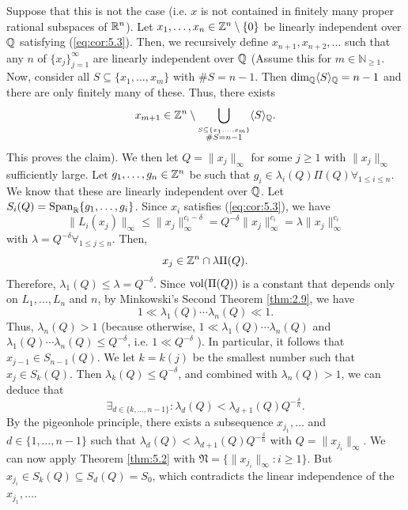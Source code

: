 \documentclass{Vorlesungstemplate_English} %
\renewcommand{\N}{\mathbb{N}_{\geq 1}}
\begin{document}
\begin{pf}
  Suppose that this is not the case (i.e. $x$ is not contained in finitely many proper rational subspaces of $\mathbb{R}^n$). Let $x_1, \dots, x_n \in \mathbb{Z}^n \setminus \{ 0\}$ be linearly independent over $\mathbb{Q}$ satisfying (\ref{eq:cor:5.3}). Then, we recursively define $x_{n+1}, x_{n+2}, \dots$ such that any $n$ of $\{ x_j\}_{j=1}^{\infty}$ are linearly independent over $\mathbb{Q}$ {\color{blue} (Assume this for $m \in \N$. Now, consider all $S \subseteq \{ x_1, \dots , x_m\}$ with $\# S = n-1$. Then $\dim_{\mathbb{Q}}\langle S\rangle_{\mathbb{Q}} = n-1$ and there are only finitely many of these. Thus, there exists \[x_{m+1} \in \mathbb{Z}^n \setminus \bigcup_{\stackrel{S \subseteq \{ x_1, \dots, x_m\}}{\#S = n-1}} \langle S \rangle_{\mathbb{Q}}.\]
  This proves the claim)}. We then let $Q = \|x_j\|_{\infty}$ for some $j \geq 1$ with $\|x_j\|_{\infty}$ sufficiently large. Let $g_1, \dots, g_n \in \mathbb{Z}^n$ be such that $g_i \in \lambda_i(Q)\Pi(Q) \forall_{1 \leq i \leq n}$. We know that these are linearly independent over $\mathbb{Q}$. Let $S_i(Q) = \text{Span}_{\mathbb{R}}\{ g_1, \dots, g_i\}$. Since $x_i$ satisfies (\ref{eq:cor:5.3}), we have
  \[ \|L_i(x_j)\|_{\infty} \leq \|x_j\|_{\infty}^{c_i-\delta} = Q^{-\delta}\|x_j\|_{\infty}^{c_i} = \lambda\|x_j\|_{\infty}^{c_i}\]
  with $\lambda = Q^{-\delta} \forall_{1 \leq j \leq n}$. Then,
  \[ x_j \in \mathbb{Z}^n \cap \lambda\Pi(Q).\]
  Therefore, $\lambda_1(Q) \leq \lambda = Q^{-\delta}$. Since $\text{vol}(\Pi(Q))$ is a constant that depends only on $L_1, \dots, L_n$ and $n$, by Minkowski's Second Theorem \ref{thm:2.9}, we have
  \[ 1 \ll \lambda_1(Q)\cdots\lambda_n(Q) \ll 1.\]
  Thus, $\lambda_n(Q) > 1$ (because otherwise, $1 \ll \lambda_1(Q)\cdots\lambda_n(Q)$ and $\lambda_1(Q)\cdots\lambda_n(Q) \leq Q^{-\delta}$, i.e. $1 \ll Q^{-\delta}$ \Lightning). In particular, it follows that $x_{j-1} \in S_{n-1}(Q)$. We let $k=k(j)$ be the smallest number such that $x_j \in S_k(Q)$. Then $\lambda_k(Q) \leq Q^{-\delta}$, and combined with $\lambda_n(Q) > 1$, we can deduce that
  \[ \exists_{d \in \{k, \dots, n-1\}}: \lambda_d(Q) < \lambda_{d+1}(Q)Q^{-\frac{\delta}{n}}.\]
  By the pigeonhole principle, there exists a subsequence $x_{j_1}, \dots$ and $d \in \{ 1, \dots, n-1\}$ such that $\lambda_d(Q) < \lambda_{d+1}(Q)Q^{-\frac{\delta}{n}}$ with $Q = \|x_{j_i}\|_{\infty}$. We can now apply Theorem \ref{thm:5.2} with $\mathfrak N = \{ \|x_{j_i}\|_{\infty}: i \geq 1\}$. But $x_{j_i} \in S_k(Q) \subseteq S_d(Q) = S_0$, which contradicts the linear independence of the $x_{j_1}, \dots$. \Lightning
\end{pf}
\end{document}
